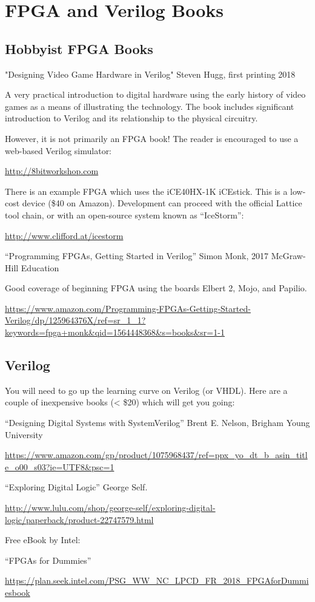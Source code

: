 \section{FPGA and Verilog Books}

\subsection{Hobbyist FPGA Books}

"Designing Video Game Hardware in Verilog"
Steven Hugg, first printing 2018

A very practical introduction to digital hardware using the early history of video games as a means of illustrating the technology.
The book includes significant introduction to Verilog and its relationship to the physical circuitry.

However, it is not primarily an FPGA book!  The reader is encouraged to use a web-based Verilog simulator:

\url{http://8bitworkshop.com}

There is an example FPGA which uses the iCE40HX-1K iCEstick.
This is a low-cost device (\$40 on Amazon).  Development can proceed
with the official Lattice tool chain, or with an open-source system
known as ``IceStorm'':

\url{http://www.clifford.at/icestorm}

``Programming FPGAs, Getting Started in Verilog''
Simon Monk, 2017 McGraw-Hill Education

Good coverage of beginning FPGA using the boards Elbert 2, Mojo, and Papilio.

\url{https://www.amazon.com/Programming-FPGAs-Getting-Started-Verilog/dp/125964376X/ref=sr_1_1?keywords=fpga+monk&qid=1564448368&s=books&sr=1-1}

\subsection{Verilog}

You will need to go up the learning curve on Verilog (or VHDL).
Here are a couple of inexpensive books (< \$20) which will get you going:

``Designing Digital Systems with SystemVerilog''
Brent E. Nelson, Brigham Young University

\url{https://www.amazon.com/gp/product/1075968437/ref=ppx_yo_dt_b_asin_title_o00_s03?ie=UTF8&psc=1}

``Exploring Digital Logic''
George Self.

\url{http://www.lulu.com/shop/george-self/exploring-digital-logic/paperback/product-22747579.html}

Free eBook by Intel:

``FPGAs for Dummies''

\url{https://plan.seek.intel.com/PSG_WW_NC_LPCD_FR_2018_FPGAforDummiesbook}

